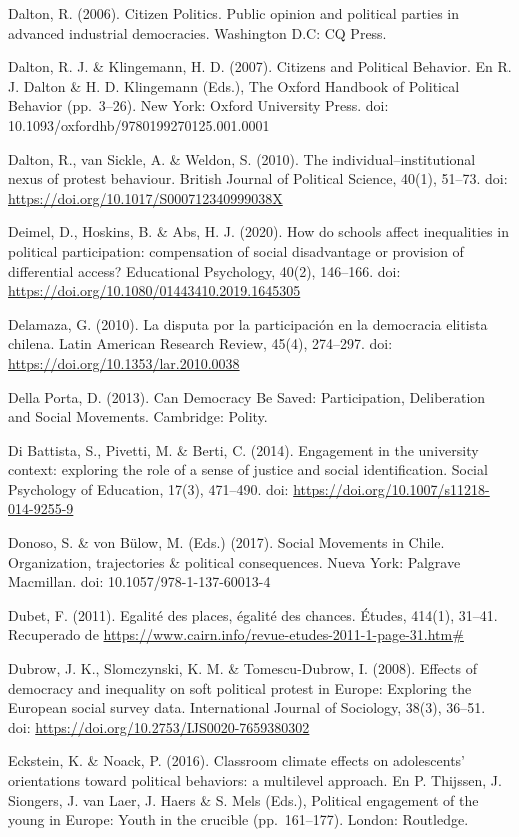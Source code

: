 \documentclass[12pt,twoside]{templates/facsothesis}
\begin{document}
Dalton, R. (2006). Citizen Politics. Public opinion and political parties in advanced industrial democracies. Washington D.C: CQ Press.

Dalton, R. J. \& Klingemann, H. D. (2007). Citizens and Political Behavior. En R. J. Dalton \& H. D. Klingemann (Eds.), The Oxford Handbook of Political Behavior (pp.~3--26). New York: Oxford University Press. doi: 10.1093/oxfordhb/9780199270125.001.0001

Dalton, R., van Sickle, A. \& Weldon, S. (2010). The individual--institutional nexus of protest behaviour. British Journal of Political Science, 40(1), 51--73. doi: \url{https://doi.org/10.1017/S000712340999038X}

Deimel, D., Hoskins, B. \& Abs, H. J. (2020). How do schools affect inequalities in political participation: compensation of social disadvantage or provision of differential access? Educational Psychology, 40(2), 146--166. doi: \url{https://doi.org/10.1080/01443410.2019.1645305}

Delamaza, G. (2010). La disputa por la participación en la democracia elitista chilena. Latin American Research Review, 45(4), 274--297. doi: \url{https://doi.org/10.1353/lar.2010.0038}

Della Porta, D. (2013). Can Democracy Be Saved: Participation, Deliberation and Social Movements. Cambridge: Polity.

Di Battista, S., Pivetti, M. \& Berti, C. (2014). Engagement in the university context: exploring the role of a sense of justice and social identification. Social Psychology of Education, 17(3), 471--490. doi: \url{https://doi.org/10.1007/s11218-014-9255-9}

Donoso, S. \& von Bülow, M. (Eds.) (2017). Social Movements in Chile. Organization, trajectories \& political consequences. Nueva York: Palgrave Macmillan. doi: 10.1057/978-1-137-60013-4

Dubet, F. (2011). Egalité des places, égalité des chances. Études, 414(1), 31--41. Recuperado de \url{https://www.cairn.info/revue-etudes-2011-1-page-31.htm\#}

Dubrow, J. K., Slomczynski, K. M. \& Tomescu-Dubrow, I. (2008). Effects of democracy and inequality on soft political protest in Europe: Exploring the European social survey data. International Journal of Sociology, 38(3), 36--51. doi: \url{https://doi.org/10.2753/IJS0020-7659380302}

Eckstein, K. \& Noack, P. (2016). Classroom climate effects on adolescents' orientations toward political behaviors: a multilevel approach. En P. Thijssen, J. Siongers, J. van Laer, J. Haers \& S. Mels (Eds.), Political engagement of the young in Europe: Youth in the crucible (pp.~161--177). London: Routledge.
\end{document}
